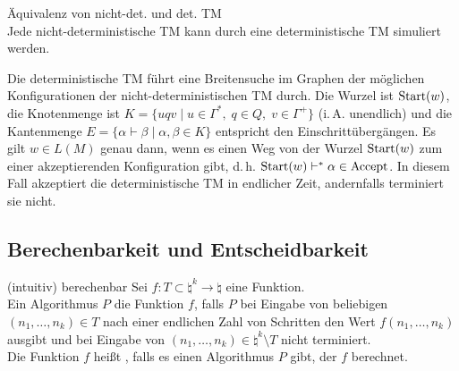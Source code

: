 \begin{Satz}{Äquivalenz von nicht-det. und det. TM}\\
    Jede nicht-deterministische TM kann durch eine deterministische TM simuliert werden.
\end{Satz}

\begin{Beweis}
    Die deterministische TM führt eine Breitensuche im Graphen der möglichen Konfigurationen
    der nicht-deterministischen TM durch.
    Die Wurzel ist $\text{Start}(w)$, die Knotenmenge ist
    $K = \{uqv \;|\; u \in \Gamma^\ast,\; q \in Q,\; v \in \Gamma^+\}$ (i.\,A. unendlich) und
    die Kantenmenge $E = \{\alpha \vdash \beta \;|\; \alpha, \beta \in K\}$ entspricht den
    Einschrittübergängen.
    Es gilt $w \in L(M)$ genau dann, wenn es einen Weg von der Wurzel $\text{Start}(w)$
    zum einer akzeptierenden Konfiguration gibt, d.\,h. $\text{Start}(w) \vdash^\ast \alpha \in \text{Accept}$.
    In diesem Fall akzeptiert die deterministische TM in endlicher Zeit, andernfalls terminiert
    sie nicht.
\end{Beweis}

\pagebreak

\subsection{%
    Berechenbarkeit und Entscheidbarkeit%
}

\begin{Def}{(intuitiv) berechenbar}
    Sei $f\colon T \subset \natural^k \rightarrow \natural$ eine Funktion.\\
    Ein Algorithmus $P$  die Funktion $f$, falls $P$ bei Eingabe von beliebigen
    $(n_1, \dotsc, n_k) \in T$ nach einer endlichen Zahl von Schritten
    den Wert $f(n_1, \dotsc, n_k)$ ausgibt und bei Eingabe von
    $(n_1, \dotsc, n_k) \in \natural^k \setminus T$ nicht terminiert.\\
    Die Funktion $f$ heißt , falls es einen Algorithmus $P$ gibt, der $f$
    berechnet.
\end{Def}

